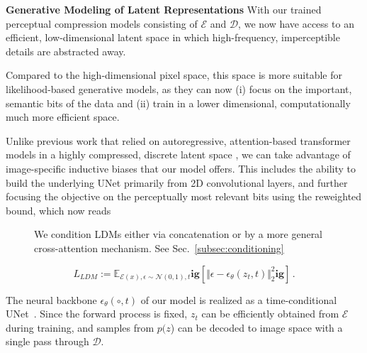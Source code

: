  \textbf{Generative Modeling of Latent Representations} With our trained perceptual compression models consisting of $\mathcal{E}$ and $\mathcal{D}$, 
we now have access to an efficient, low-dimensional latent space in which high-frequency, imperceptible details are abstracted away.

Compared to the high-dimensional pixel space, this space is more suitable for likelihood-based generative models, as they can now (i) focus on the important, semantic bits of the data and (ii) train in a lower dimensional, computationally much more efficient space.

Unlike previous work that relied on autoregressive, attention-based transformer models in a highly compressed, discrete latent space \cite{DBLP:journals/corr/abs-2102-12092, DBLP:journals/corr/abs-2012-09841, yu2021vectorquantized}, we can take advantage of image-specific inductive biases that our model offers. This includes the ability to build the underlying UNet primarily from 2D convolutional layers, and further focusing the objective on the perceptually most relevant bits using the reweighted bound, which now reads

\begin{figure}[tbp]
\centering

  \caption{\label{fig:conditioning} We condition LDMs either via concatenation 
  or by a more general cross-attention mechanism. See Sec.~\ref{subsec:conditioning} }
\end{figure}

\begin{equation}
L_{LDM} := \mathbb{E}_{\mathcal{E}(x), \epsilon \sim \mathcal{N}(0, 1),  t}\mathbf{ig}[ \Vert \epsilon - \epsilon_\theta(z_{t},t) \Vert_{2}^{2}\mathbf{ig}] \, .
\label{eq:ldmloss}
\end{equation}

The neural backbone $\epsilon_\theta(\circ, t)$ of our model is realized as a time-conditional UNet~\cite{DBLP:conf/miccai/RonnebergerFB15}. Since the forward process is fixed, $z_{t}$ can be efficiently obtained from
$\mathcal{E}$ during training, and samples from $p(z$) can be decoded to image space with a single pass through $\mathcal{D}$.

